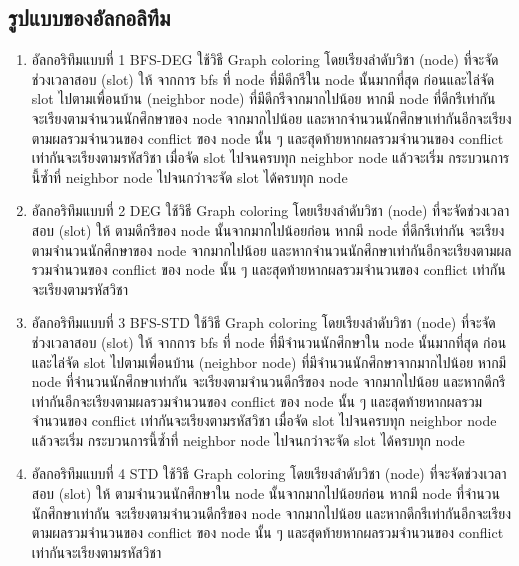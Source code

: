 \subsection{รูปแบบของอัลกอลิทึม}
\begin{enumerate}
  \item อัลกอริทึมแบบที่ 1 BFS-DEG ใช้วิธี Graph coloring โดยเรียงลำดับวิชา (node) ที่จะจัดช่วงเวลาสอบ (slot) ให้ จากการ bfs ที่ node ที่มีดีกรีใน node นั้นมากที่สุด
  ก่อนและไล่จัด slot ไปตามเพื่อนบ้าน (neighbor node) ที่มีดีกรีจากมากไปน้อย หากมี node ที่ดีกรีเท่ากัน จะเรียงตามจำนวนนักศึกษาของ node จากมากไปน้อย และหากจำนวนนักศึกษาเท่ากันอีกจะเรียงตามผลรวมจำนวนของ conflict ของ node นั้น ๆ 
  และสุดท้ายหากผลรวมจำนวนของ conflict เท่ากันจะเรียงตามรหัสวิชา เมื่อจัด slot ไปจนครบทุก neighbor node แล้วจะเริ่ม กระบวนการนี้ซ้ำที่ neighbor node ไปจนกว่าจะจัด slot ได้ครบทุก node
  \item อัลกอริทึมแบบที่ 2 DEG ใช้วิธี Graph coloring โดยเรียงลำดับวิชา (node) ที่จะจัดช่วงเวลาสอบ (slot) ให้ ตามดีกรีของ node นั้นจากมากไปน้อยก่อน
  หากมี node ที่ดีกรีเท่ากัน จะเรียงตามจำนวนนักศึกษาของ node จากมากไปน้อย และหากจำนวนนักศึกษาเท่ากันอีกจะเรียงตามผลรวมจำนวนของ conflict ของ node นั้น ๆ 
  และสุดท้ายหากผลรวมจำนวนของ conflict เท่ากันจะเรียงตามรหัสวิชา
  \item อัลกอริทึมแบบที่ 3 BFS-STD ใช้วิธี Graph coloring โดยเรียงลำดับวิชา (node) ที่จะจัดช่วงเวลาสอบ (slot) ให้ จากการ bfs ที่ node ที่มีจำนวนนักศึกษาใน node นั้นมากที่สุด
  ก่อนและไล่จัด slot ไปตามเพื่อนบ้าน (neighbor node) ที่มีจำนวนนักศึกษาจากมากไปน้อย หากมี node ที่จำนวนนักศึกษาเท่ากัน จะเรียงตามจำนวนดีกรีของ node จากมากไปน้อย และหากดีกรีเท่ากันอีกจะเรียงตามผลรวมจำนวนของ conflict ของ node นั้น ๆ 
  และสุดท้ายหากผลรวมจำนวนของ conflict เท่ากันจะเรียงตามรหัสวิชา เมื่อจัด slot ไปจนครบทุก neighbor node แล้วจะเริ่ม กระบวนการนี้ซ้ำที่ neighbor node ไปจนกว่าจะจัด slot ได้ครบทุก node
  \item อัลกอริทึมแบบที่ 4 STD ใช้วิธี Graph coloring โดยเรียงลำดับวิชา (node) ที่จะจัดช่วงเวลาสอบ (slot) ให้ ตามจำนวนนักศึกษาใน node นั้นจากมากไปน้อยก่อน
  หากมี node ที่จำนวนนักศึกษาเท่ากัน จะเรียงตามจำนวนดีกรีของ node จากมากไปน้อย และหากดีกรีเท่ากันอีกจะเรียงตามผลรวมจำนวนของ conflict ของ node นั้น ๆ 
  และสุดท้ายหากผลรวมจำนวนของ conflict เท่ากันจะเรียงตามรหัสวิชา
    
\end{enumerate}


